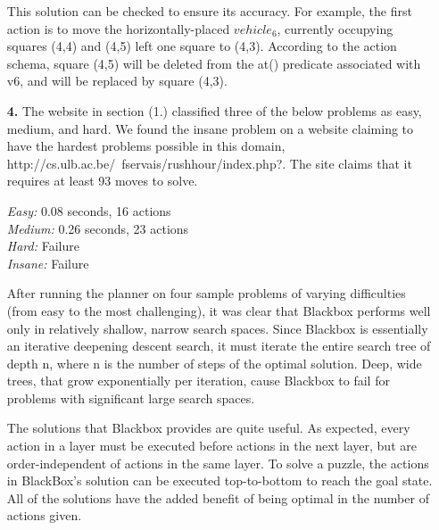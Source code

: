 \documentclass{article}
\begin{document}
\begin{enumerate}
This solution can be checked to ensure its accuracy. For example, the
first action is to move the horizontally-placed $vehicle_6$, currently
occupying squares (4,4) and (4,5) left one square to (4,3). According to
the action schema, square (4,5) will be deleted from the at() predicate
associated with v6, and will be replaced by square (4,3).

\item[\textbf{4.}]
The website in section (1.) classified three of the below problems as
easy, medium, and hard. We found the insane problem on a website
claiming to have the hardest problems possible in this domain,
http://cs.ulb.ac.be/~fservais/rushhour/index.php?. The
site claims that it requires at least 93 moves to solve.

\emph{Easy:} 0.08 seconds, 16 actions\\
\emph{Medium:} 0.26 seconds, 23 actions\\
\emph{Hard:} Failure\\
\emph{Insane:} Failure

After running the planner on four sample problems of varying
difficulties (from easy to the most challenging), it was clear that
Blackbox performs well only in relatively shallow, narrow search
spaces. Since Blackbox is essentially an iterative deepening descent
search, it must iterate the entire search tree of depth n, where n is
the number of steps of the optimal solution.  Deep, wide trees, that
grow exponentially per iteration, cause Blackbox to fail for problems
with significant large search spaces.

The solutions that Blackbox provides are quite useful. As expected,
every action in a layer must be executed before actions in the next
layer, but are order-independent of actions in the same layer. To solve
a puzzle, the actions in BlackBox's solution can be executed 
top-to-bottom to reach the goal state. All of the solutions have the
added benefit of being optimal in the number of actions given.

\end{enumerate}
\end{document}

